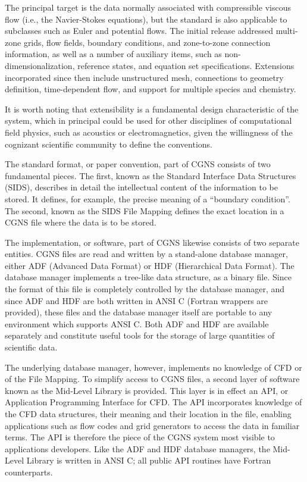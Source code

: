 The principal target is the data normally associated with compressible
viscous flow (i.e., the Navier-Stokes equations), but the standard is
also applicable to subclasses such as Euler and potential flows. The
initial release addressed multi-zone grids, flow fields, boundary
conditions, and zone-to-zone connection information, as well as a number
of auxiliary items, such as non-dimensionalization, reference states,
and equation set specifications. Extensions incorporated since then
include unstructured mesh, connections to geometry definition,
time-dependent flow, and support for multiple species and chemistry.

It is worth noting that extensibility is a fundamental design
characteristic of the system, which in principal could be used for
other disciplines of computational field physics, such as acoustics or
electromagnetics, given the willingness of the cognizant scientific
community to define the conventions.

The standard format, or paper convention, part of CGNS consists of
two fundamental pieces. The first, known as the Standard Interface
Data Structures (SIDS), describes in detail the intellectual content
of the information to be stored. It defines, for example, the precise
meaning of a ``boundary condition''.
The second, known as the SIDS File Mapping defines
the exact location in a CGNS file where the data is to be stored.

The implementation, or software, part of CGNS likewise consists of two
separate entities.
CGNS files are read and written by a stand-alone database manager,
either ADF (Advanced Data Format) or HDF (Hierarchical Data Format).
The database manager implements a tree-like data structure, as a
binary file.
Since the format of this file is completely controlled by the database
manager, and since ADF and HDF are both written in ANSI C (Fortran
wrappers are provided), these files and the database manager itself are
portable to any environment which supports ANSI C.
Both ADF and HDF are available separately and constitute useful tools
for the storage of large quantities of scientific data.

The underlying database manager, however, implements no knowledge of
CFD or of the File Mapping.
To simplify access to CGNS files, a second layer of software known as
the Mid-Level Library is provided.
This layer is in effect an API, or Application Programming Interface for
CFD.
The API incorporates knowledge of the CFD data structures, their meaning
and their location in the file, enabling applications such as flow codes
and grid generators to access the data in familiar terms.
The API is therefore the piece of the CGNS system most visible to
applications developers.
Like the ADF and HDF database managers, the Mid-Level Library is written
in ANSI C; all public API routines have Fortran counterparts.

